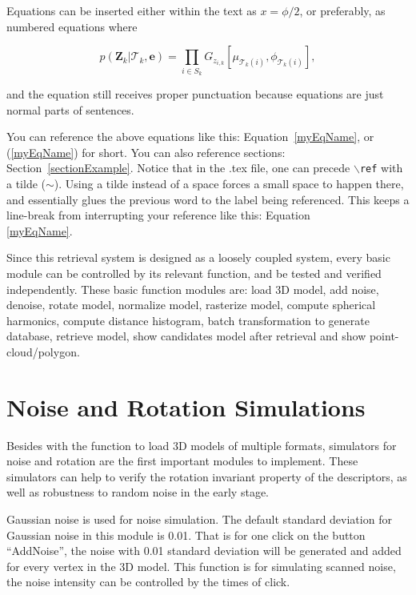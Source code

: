 

Equations can be inserted either within the text as $x=\phi/2$, or preferably, as
numbered equations where

\begin{equation} \label{myEqName}
 p(\mathbf{Z}_{k}|\mathcal{T}_{k},\mathbf{e}) = \prod_{i\in S_{k}}
G_{z_{i,k}}[\mu_{\mathcal{T}_{k}(i)},\phi_{\mathcal{T}_{k}(i)}],
\end{equation}

and the equation still receives proper punctuation because equations are just normal parts of sentences.

You can reference the above equations like this:  Equation~\ref{myEqName}, or (\ref{myEqName}) for short.  You can also reference sections:  Section~\ref{sectionExample}. Notice that in the .tex file, one can precede \texttt{$\backslash$ref} with a tilde ($\sim$). Using a tilde instead of a space forces a small space to happen there, and essentially glues the previous word to the label being referenced. This keeps a line-break from interrupting your reference like this: Equation\\ \ref{myEqName}. 




Since this retrieval system is designed as a loosely coupled system, every basic module can be controlled by its relevant function, and be tested and verified independently. These basic function modules are: load 3D model, add noise, denoise, rotate model, normalize model, rasterize model, compute spherical harmonics, compute distance histogram, batch transformation to generate database, retrieve model, show candidates model after retrieval and show point-cloud/polygon. 

\section{Noise and Rotation Simulations}

Besides with the function to load 3D models of multiple formats, simulators for noise and rotation are the first important modules to implement. These simulators can help to verify the rotation invariant property of the descriptors, as well as robustness to random noise in the early stage.

Gaussian noise is used for noise simulation. The default standard deviation for Gaussian noise in this module is 0.01. That is for one click on the button ``AddNoise'', the noise with 0.01 standard deviation will be generated and added for every vertex in the 3D model. This function is for simulating scanned noise, the noise intensity can be controlled by the times of click. 

